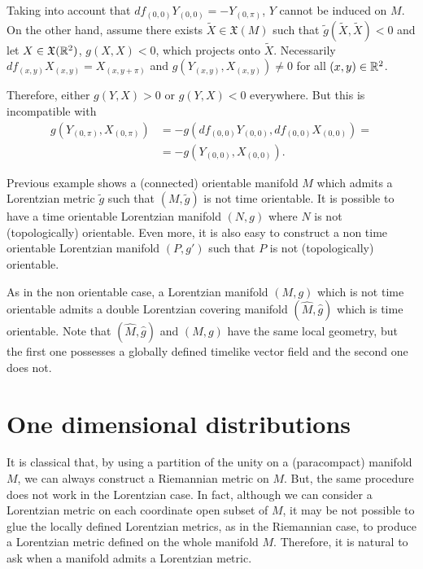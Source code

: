 \begin{example}
    Taking into account that $df_{(0,0)}Y_{(0,0)}=-Y_{(0,\pi)}$, $Y$ cannot be induced on $M$. On the other hand, assume there exists ${\tilde X}\in \mathfrak{X}(M)$ such that ${\tilde g}({\tilde X},{\tilde X})<0$ and let $X\in \mathfrak{X}(\mathbb{R}^2)$, $g(X,X)<0$, which projects onto ${\tilde X}$. Necessarily $df_{(x,y)}X_{(x,y)}=X_{(x,y+\pi)}$ and $g(Y_{(x,y)},X_{(x,y)})\neq 0$ for all $(x,y)\in \mathbb{R}^2$.

    Therefore, either $g(Y,X)>0$ or $g(Y,X)<0$ everywhere. But this is incompatible with
    \begin{align*}
        g\left(Y_{(0,\pi)},X_{(0,\pi)}\right) &= -g\left(df_{(0,0)}Y_{(0,0)},df_{(0,0)}X_{(0,0)}\right)=\\
        &= -g\left(Y_{(0,0)},X_{(0,0)}\right).
    \end{align*}
\end{example}


Previous example shows a (connected) orientable manifold $M$ which admits a Lorentzian metric ${\tilde g}$ such that $(M,{\tilde g})$ is not time orientable. It is possible to have a time orientable Lorentzian manifold $(N,g)$ where $N$ is not (topologically) orientable. Even more, it is also easy to construct a non time orientable Lorentzian manifold $(P,g')$ such that $P$ is not (topologically) orientable.

As in the non orientable case, a Lorentzian manifold $(M,g)$ which is not time orientable admits a double Lorentzian covering manifold $({\hat M},{\hat g})$ which is time orientable. Note that $({\hat M}, {\hat g})$ and $(M,g)$ have the same local geometry, but the first one possesses a globally defined timelike vector field and the second one does not.

\section{One dimensional distributions}

It is classical that, by using a partition of the unity on a (paracompact) manifold $M$, we can always construct a Riemannian metric on $M$. But, the same procedure does not work in the Lorentzian case. In fact, although we can consider a Lorentzian metric on each coordinate open subset of $M$, it may be not possible to glue the locally defined Lorentzian metrics, as in the Riemannian case, to produce a Lorentzian metric defined on the whole manifold $M$. Therefore, it is natural to ask when a manifold admits a Lorentzian metric.

